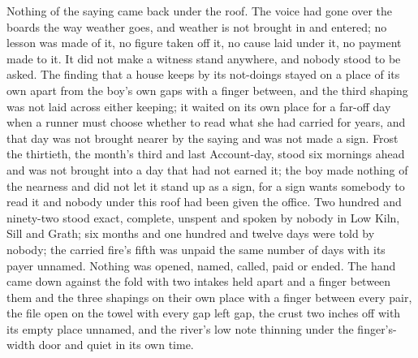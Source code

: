 Nothing of the saying came back under the roof. The voice had gone over the boards the way weather goes, and weather is not brought in and entered; no lesson was made of it, no figure taken off it, no cause laid under it, no payment made to it. It did not make a witness stand anywhere, and nobody stood to be asked. The finding that a house keeps by its not-doings stayed on a place of its own apart from the boy's own gaps with a finger between, and the third shaping was not laid across either keeping; it waited on its own place for a far-off day when a runner must choose whether to read what she had carried for years, and that day was not brought nearer by the saying and was not made a sign. Frost the thirtieth, the month's third and last Account-day, stood six mornings ahead and was not brought into a day that had not earned it; the boy made nothing of the nearness and did not let it stand up as a sign, for a sign wants somebody to read it and nobody under this roof had been given the office. Two hundred and ninety-two stood exact, complete, unspent and spoken by nobody in Low Kiln, Sill and Grath; six months and one hundred and twelve days were told by nobody; the carried fire's fifth was unpaid the same number of days with its payer unnamed. Nothing was opened, named, called, paid or ended. The hand came down against the fold with two intakes held apart and a finger between them and the three shapings on their own place with a finger between every pair, the file open on the towel with every gap left gap, the crust two inches off with its empty place unnamed, and the river's low note thinning under the finger's-width door and quiet in its own time.
